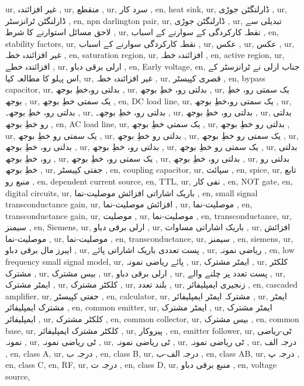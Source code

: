 ur, غیر افزائندہ ,
ur, منقطع ,
ur, سرد کار ,
en, heat sink,
ur, ڈارلنگٹن جوڑی ,
ur, ڈارلنگٹن ٹرانزسٹر ,
en, npn darlington pair,
ur, ڈارلنگٹن جوڑی ,
ur, تبدیلی  سے لاحق مسائل استوارنے کا شرط ,
ur, نقطہ کارکردگی کے سوارنے کے اسباب ,
en, stability factors,
ur, نقطہ کارکردگی سوارنے کے اسباب ,
ur, عکس ,
ur, عکس ,
ur, غیر افزائندہ خطہ ,
en, saturation region,
ur, افزائندہ خطہ ,
en, active region,
ur, افزائندہ خطے  ,
ur, ارلی برقی دباو ,
en, Early voltage,
en, جناب ارلی نے ٹرانزسٹر کے اس پہلو کا مطالعہ کیا,
ur, غیر افزائندہ خطہ ,
ur, قصری کپیسٹر ,
en, bypass capacitor,
ur, بدلتی رو،خطِ بوجھ ,
ur, بدلتی رو، خطِ بوجھ ,
ur, یک سمتی رو، خطِ بوجھ ,
ur, یک سمتی خطِ بوجھ ,
en, DC load line,
ur, یک سمتی رو،خطِ بوجھ ,
ur, بدلتی رو، خطِ بوجھ۔ ,
ur, بدلتی رو، خطِ بوجھ۔ ,
ur, بدلتی رو، خطِ بوجھ ,
ur, بدلتی رو خطِ بوجھ ,
en, AC load line,
ur, یک سمتی خطِ بوجھ ,
ur, بدلتی رو خطِ بوجھ ,
ur, یک سمتی رو خطِ بوجھ ,
ur, بدلتی رو خطِ بوجھ ,
ur, یک سمتی رو خطِ بوجھ ,
ur, بدلتی رو، خطِ بوجھ ,
ur, بدلتی رو، خطِ بوجھ ,
ur, یک سمتی رو خطِ بوجھ ,
ur, بدلتی رو، خطِ بوجھ ,
ur, یک سمتی رو، خطِ بوجھ ,
ur, بدلتی رو، خطِ بوجھ ,
ur, بدلتی رو خطِ بوجھ ,
ur, جفتی کپیسٹر ,
en, coupling capacitor,
ur, سپائث ,
en, spice,
ur, تابع منبع رو ,
en, dependent current source,
en, TTL,
ur, نفی کار ,
en, NOT gate,
en, digital circuits,
ur, باریک اشاراتی افزائش موصلیت-نما ,
en, small signal transconductance gain,
ur, افزائش موصلیت-نما ,
ur, موصلیت-نما ,
en, transconductance gain,
ur, موصلیت ,
ur, موصلیت-نما ,
en, transconductance,
ur, سیمنز ,
en, Siemens,
ur, ارلی برقی دباو ,
ur, باریک اشاراتی مساوات ,
ur, افزائش موصلیت-نما ,
ur, موصلیت-نما ,
en, transconductance,
ur, سیمنز ,
en, siemens,
ur, ایبرز مال برقی دباو ,
ur, پست تعددی باریک اشاراتی پائے ,
ur,  ریاضی نمونہ ,
en, low frequency small signal  model,
ur, پائے ریاضی نمونہ ,
ur, ایمٹر مشترک ,
ur, کلکٹر مشترک  ,
ur, بیس مشترک  ,
ur, ارلی برقی دباو ,
ur, پست تعدد پر چلنے والے ,
ur, ایمٹر مشترک ,
ur, کلکٹر مشترک ,
ur, بلند تعدد ,
ur, زنجیری ایمپلیفائر ,
en, cascaded amplifier,
ur, جفتی کپیسٹر ,
en, calculator,
ur, مشترکہ ایمٹر ایمپلیفائر ,
ur, ایمٹر مشترک ایمپلیفائر ,
en, common emitter,
ur, ایمٹر مشترک ,
ur, ایمٹر مشترک ایمپلیفائر ,
ur, کلکٹر مشترک ,
en, common collector,
ur, بیس مشترک ,
en, common base,
ur, کلکٹر مشترک ایمپلیفائر ,
ur, پیروکار ,
en, emitter follower,
ur, ٹی-ریاضی نمونہ ,
ur, ٹی ریاضی نمونہ ,
ur, ٹی ریاضی نمونہ ,
ur, ٹی ریاضی نمونہ ,
ur, درجہ الف ,
en, class A,
ur, درجہ ب ,
en, class B,
ur, درجہ الف-ب ,
en, class AB,
ur, درجہ پ ,
en, class C,
en, RF,
ur, درجہ ت ,
en, class D,
ur, منبع برقی دباو ,
en, voltage source,

